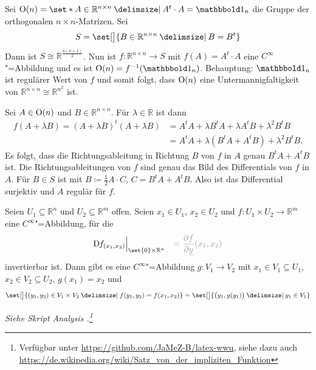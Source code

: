 \begin{beispiel}[{name=[Orthogonale Matrizen als Untermannigfaltigkeit]}]
	Sei $\On(n) = \set*{A \in \mathbb{R}^{n \times n} \given  A^t \cdot A= \ind_n}$ die Gruppe der orthogonalen $n \times n$-Matrizen. Sei 
	\[
		S = \set[\big]{B \in \mathbb{R}^{n \times n} \given B = B^t}
	\]
	Dann ist $S \cong \mathbb{R}^{\frac{n(n+1)}{2}}$. 
	Nun ist $f \colon \mathbb{R}^{n \times n} \to S$ mit $f(A)= A^t \cdot A$ eine 
	$C^\infty$"=Abbildung und es ist $\On(n) = f^{-1}(\ind_n)$.
	Behauptung: $\ind_n$ ist regulärer Wert von $f$ und somit folgt, dass $\operatorname{O}(n)$ eine Untermannigfaltigkeit von $\mathbb{R}^{n \times n} \cong \mathbb{R}^{n^2}$ ist.
\end{beispiel}
\begin{beweis}
		Sei $A \in \operatorname{O}(n)$ und $B \in \mathbb{R}^{n \times n}$. 
		Für $\lambda \in \mathbb{R}$ ist dann 
		\begin{align*}
			f(A+ \lambda B) = (A+ \lambda B)^t (A+ \lambda B) &= A^t A + \lambda B^t A + \lambda A^t B + \lambda^2 B^t B \\ &= A^t A + \lambda (B^t A + A^t B) + \lambda^2 B^t B.
		\end{align*}
		Es folgt, dass die Richtungsableitung in Richtung $B$ von $f$ in $A$ genau $B^t A + A^t B$ ist. 
		Die Richtungsableitungen von $f$ sind genau das Bild des Differentials von $f$ in $A$. 
		Für $B \in S$ ist mit $B \coloneqq \frac{1}{2} A \cdot C $, $C = B^t A + A^t B$. 
		Also ist das Differential surjektiv und $A$ regulär für $f$.
\end{beweis}

\begin{satz}[{name={über implizite Funktionen}},label=satz:implizite-fkt]
	Seien $U_1 \subseteq \mathbb{R}^n$ und $U_2 \subseteq \mathbb{R}^m$ offen. 
	Seien $x_1 \in U_1$, $x_2 \in U_2$ und $f \colon U_1 \times U_2 \to \mathbb{R}^m$ eine 
	$C^\infty$"=Abbildung, für die
	\[
		\D f_{(x_1,x_2)} \Big|_{\set{0} \times \mathbb{R}^n } \quad {\color{light_gray} = \diff{f}{\underline{y}} (x_1, x_2)}
	\]
	invertierbar ist. 
	Dann gibt es eine $C^\infty$"=Abbildung $g \colon V_1 \to V_2$ mit $x_1 \in V_1 \subseteq U_1$, $x_2 \in V_2 \subseteq U_2$, $g(x_1)=x_2$ und 
	\[
		\set[\big]{(y_1, y_2) \in V_1 \times V_2 \given f(y_1, y_2)= f(x_1,x_2)} = \set[\big]{{\enbrace[\big]{y_1, g(y_1)}} \given y_1 \in V_1}  
	\]
\end{satz}
\begin{beweis}
	\emph{Siehe Skript Analysis .\footnote{\label{note5}Verfügbar unter \url{https://github.com/JaMeZ-B/latex-wwu}, siehe dazu auch \url{https://de.wikipedia.org/wiki/Satz_von_der_impliziten_Funktion}}}
\end{beweis}

